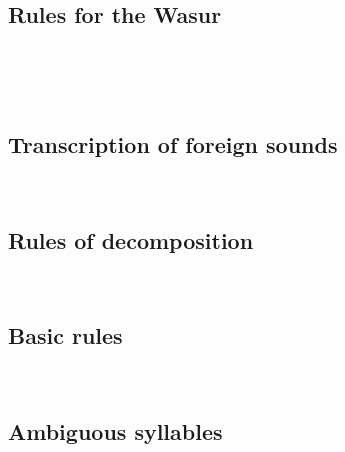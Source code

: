 \documentclass[%
a4paper,%
pagesize,%
12pt,%
parskip=off,%
bibliography=totoc,%
numbers=noenddot,%
DIV=12,%
twoside=semi,%
headings=normal%
]{scrartcl}
\begin{document}
\subsection{Rules for the Wasur}

­

­\subsection{Transcription of foreign sounds}


­\subsection{Rules of decomposition}

­\subsection{Basic rules}

­\subsection{Ambiguous syllables}

­



\end{document}
